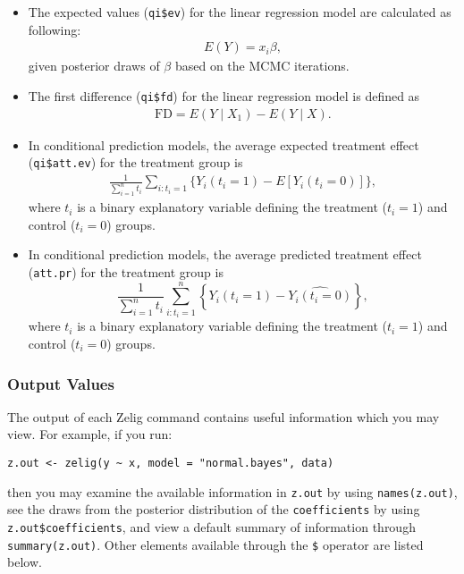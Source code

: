 \begin{itemize}
\item The expected values (\texttt{qi\$ev}) for the linear regression model are
calculated as following:
\begin{eqnarray*}
E(Y) = x_{i} \beta,
\end{eqnarray*}
given posterior draws of $\beta$ based on the MCMC iterations.

\item The first difference (\texttt{qi\$fd}) for the linear regression model 
is defined as
\begin{eqnarray*}
\text{FD}=E(Y\mid X_{1})-E(Y\mid X).
\end{eqnarray*}

\item In conditional prediction models, the average expected treatment effect
(\texttt{qi\$att.ev}) for the treatment group is
\begin{eqnarray*}
\frac{1}{\sum_{i=1}^n t_{i}}\sum_{i:t_{i}=1} \{
Y_{i}(t_{i}=1)-E[Y_{i}(t_{i}=0)] \},
\end{eqnarray*}
where $t_{i}$ is a binary explanatory variable defining the treatment
($t_{i}=1$) and control ($t_{i}=0$) groups. 

\item In conditional prediction models, the average predicted treatment
  effect ({\tt att.pr}) for the treatment group is 
    \begin{equation*} \frac{1}{\sum_{i=1}^n t_i}\sum_{i:t_i=1}^n \left\{ Y_i(t_i=1) -
      \widehat{Y_i(t_i=0)} \right\},
    \end{equation*} 
where $t_{i}$ is a binary explanatory variable defining the treatment
($t_{i}=1$) and control ($t_{i}=0$) groups. 

\end{itemize}

\subsubsection{Output Values}

The output of each Zelig command contains useful information which you may
view. For example, if you run:
\begin{verbatim}
z.out <- zelig(y ~ x, model = "normal.bayes", data)
\end{verbatim}

\noindent then you may examine the available information in \texttt{z.out} by
using \texttt{names(z.out)}, see the draws from the posterior distribution of
the \texttt{coefficients} by using \texttt{z.out\$coefficients}, and view a 
default summary of information through \texttt{summary(z.out)}. Other elements
available through the \texttt{\$} operator are listed below.

